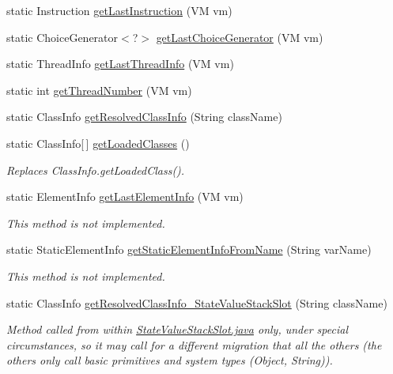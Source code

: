 \begin{DoxyCompactItemize}
\item 
static Instruction \hyperlink{classgov_1_1nasa_1_1jpf_1_1inspector_1_1migration_1_1_migration_utilities_ab67c2959e094b3c63c4a247ba876e091}{get\+Last\+Instruction} (VM vm)
\item 
static Choice\+Generator$<$?$>$ \hyperlink{classgov_1_1nasa_1_1jpf_1_1inspector_1_1migration_1_1_migration_utilities_a59b01084fb64116caedf3fb068af3ae4}{get\+Last\+Choice\+Generator} (VM vm)
\item 
static Thread\+Info \hyperlink{classgov_1_1nasa_1_1jpf_1_1inspector_1_1migration_1_1_migration_utilities_a391b83af6df7665cda87709b6a8fcc05}{get\+Last\+Thread\+Info} (VM vm)
\item 
static int \hyperlink{classgov_1_1nasa_1_1jpf_1_1inspector_1_1migration_1_1_migration_utilities_a6ee047cf88e4d11e9cd152dcf679d268}{get\+Thread\+Number} (VM vm)
\item 
static Class\+Info \hyperlink{classgov_1_1nasa_1_1jpf_1_1inspector_1_1migration_1_1_migration_utilities_a39f88c90978607eee2a5773557848035}{get\+Resolved\+Class\+Info} (String class\+Name)
\item 
static Class\+Info\mbox{[}$\,$\mbox{]} \hyperlink{classgov_1_1nasa_1_1jpf_1_1inspector_1_1migration_1_1_migration_utilities_a758f3ec518fcb042f6ed46c36b2c342c}{get\+Loaded\+Classes} ()
\begin{DoxyCompactList}\small\item\em Replaces Class\+Info.\+get\+Loaded\+Class(). \end{DoxyCompactList}\item 
static Element\+Info \hyperlink{classgov_1_1nasa_1_1jpf_1_1inspector_1_1migration_1_1_migration_utilities_a97cf532b164e74cbdc4e0583f0e1b4e7}{get\+Last\+Element\+Info} (VM vm)
\begin{DoxyCompactList}\small\item\em This method is not implemented. \end{DoxyCompactList}\item 
static Static\+Element\+Info \hyperlink{classgov_1_1nasa_1_1jpf_1_1inspector_1_1migration_1_1_migration_utilities_a91fc3768c86a969ad513772432365c56}{get\+Static\+Element\+Info\+From\+Name} (String var\+Name)
\begin{DoxyCompactList}\small\item\em This method is not implemented. \end{DoxyCompactList}\item 
static Class\+Info \hyperlink{classgov_1_1nasa_1_1jpf_1_1inspector_1_1migration_1_1_migration_utilities_a8af0a6e27e2005f167bace752c444f20}{get\+Resolved\+Class\+Info\+\_\+\+State\+Value\+Stack\+Slot} (String class\+Name)
\begin{DoxyCompactList}\small\item\em Method called from within \hyperlink{_state_value_stack_slot_8java}{State\+Value\+Stack\+Slot.\+java} only, under special circumstances, so it may call for a different migration that all the others (the others only call basic primitives and system types (Object, String)). \end{DoxyCompactList}\end{DoxyCompactItemize}


